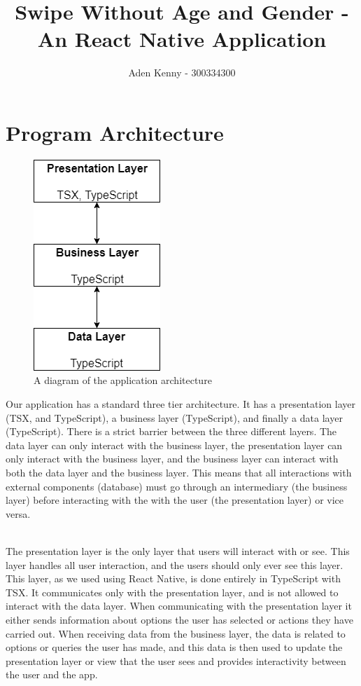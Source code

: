 \documentclass[a4paper, 11pt]{article}
\begin{document}
\title{Swipe Without Age and Gender - An React Native Application}
\author{
Aden Kenny - 300334300
}

\maketitle

\section{Program Architecture}

\begin{figure}
\centering
\captionsetup{format=hang}
\includegraphics{architecture.png}
\caption{A diagram of the application architecture}
\end{figure}

Our application has a standard three tier architecture. It has a presentation layer (TSX, and TypeScript), a business layer (TypeScript), and finally a data layer (TypeScript). There is a strict barrier between the three different layers. The data layer can only interact with the business layer, the presentation layer can only interact with the business layer, and the business layer can interact with both the data layer and the business layer. This means that all interactions with external components (database) must go through an intermediary (the business layer) before interacting with the with the user (the presentation layer) or vice versa.

~\\
The presentation layer is the only layer that users will interact with or see. This layer handles all user interaction, and the users should only ever see this layer. This layer, as we used using React Native, is done entirely in TypeScript with TSX. It communicates only with the presentation layer, and is not allowed to interact with the data layer. When communicating with the presentation layer it either sends information about options the user has selected or actions they have carried out. When receiving data from the business layer, the data is related to options or queries the user has made, and this data is then used to update the presentation layer or view that the user sees and provides interactivity between the user and the app.
\end{document}
